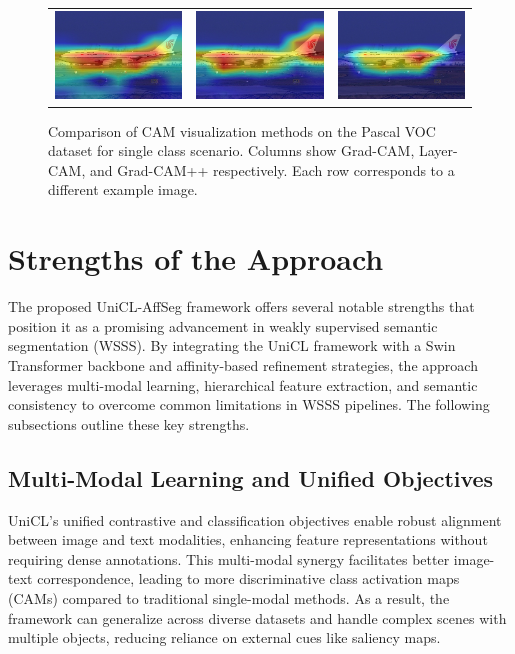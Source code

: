 \begin{figure}[!t]
\begin{tabular}{c c c}
    \includegraphics[width=0.18\linewidth, height=0.18\linewidth]{figures/cams/gradcam/2008_003976_0} &
    \includegraphics[width=0.18\linewidth, height=0.18\linewidth]{figures/cams/layercam/2008_003976_0} &
    \includegraphics[width=0.18\linewidth, height=0.18\linewidth]{figures/cams/gradcampp/2008_003976_0} \\

  \end{tabular}

  \caption{Comparison of CAM visualization methods on the Pascal VOC dataset for single class scenario. Columns show Grad-CAM, Layer-CAM, and Grad-CAM++ respectively. Each row corresponds to a different example image.}
  \label{fig:cam_variation_singleclass}
\end{figure}


\section{Strengths of the Approach}
\label{sec:strengths_of_approach}

The proposed UniCL-AffSeg framework offers several notable strengths that position it as a promising advancement in weakly supervised semantic segmentation (WSSS). By integrating the UniCL framework with a Swin Transformer backbone and affinity-based refinement strategies, the approach leverages multi-modal learning, hierarchical feature extraction, and semantic consistency to overcome common limitations in WSSS pipelines. The following subsections outline these key strengths.

\subsection{Multi-Modal Learning and Unified Objectives}
UniCL's unified contrastive and classification objectives enable robust alignment between image and text modalities, enhancing feature representations without requiring dense annotations. This multi-modal synergy facilitates better image-text correspondence, leading to more discriminative class activation maps (CAMs) compared to traditional single-modal methods. As a result, the framework can generalize across diverse datasets and handle complex scenes with multiple objects, reducing reliance on external cues like saliency maps.

